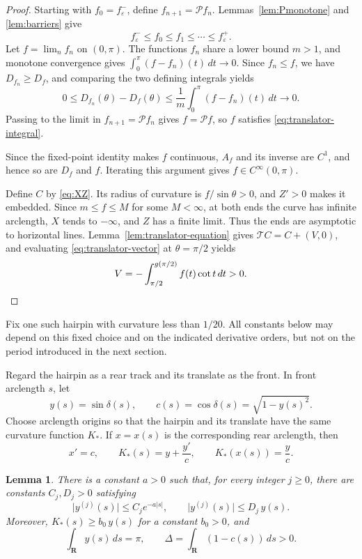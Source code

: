 \documentclass[11pt]{article}
\numberwithin{equation}{section}
\newtheorem{lemma}[theorem]{Lemma}
\newcommand{\R}{\mathbf{R}}
\newcommand{\Tmap}{\mathcal T}
\newcommand{\eps}{\varepsilon}
\newcommand{\abs}[1]{\lvert #1\rvert}
\begin{document}
\begin{proof}
Starting with \(f_0=f_\eps^-\), define \(f_{n+1}=\mathcal P f_n\).
Lemmas~\ref{lem:Pmonotone} and \ref{lem:barriers} give
\[
  f_\eps^-\leq f_0\leq f_1\leq\cdots\leq f_\eps^+.
\]
Let \(f=\lim_n f_n\) on \((0,\pi)\). The functions \(f_n\) share a lower bound
\(m>1\), and monotone convergence gives
\(\int_0^\pi(f-f_n)(t)\,dt\to0\). Since \(f_n\leq f\), we have
\(D_{f_n}\geq D_f\), and comparing the two defining integrals yields
\[
  0\leq D_{f_n}(\theta)-D_f(\theta)
  \leq\frac1m\int_0^\pi(f-f_n)(t)\,dt\longrightarrow0.
\]
Passing to the limit in \(f_{n+1}=\mathcal P f_n\) gives
\(f=\mathcal P f\), so \(f\) satisfies \eqref{eq:translator-integral}.

Since the fixed-point identity makes \(f\) continuous, \(A_f\) and its
inverse are \(C^1\), and hence so are \(D_f\) and \(f\). Iterating this
argument gives \(f\in C^\infty(0,\pi)\).

Define \(C\) by \eqref{eq:XZ}. Its radius of curvature is
\(f/\sin\theta>0\), and \(Z'>0\) makes it embedded. Since \(m\leq f\leq M\)
for some \(M<\infty\), at both ends the curve has infinite arclength,
\(X\) tends to \(-\infty\), and \(Z\) has a finite limit. Thus the ends are
asymptotic to horizontal lines. Lemma~\ref{lem:translator-equation} gives
\(\Tmap C=C+(V,0)\), and evaluating \eqref{eq:translator-vector} at
\(\theta=\pi/2\) yields
\[
  V=-\int_{\pi/2}^{g(\pi/2)}f(t)\cot t\,dt>0.
  \qedhere
\]
\end{proof}

Fix one such hairpin with curvature less than \(1/20\). All constants below may
depend on this fixed choice and on the indicated derivative orders, but not
on the period introduced in the next section.

Regard the hairpin as a rear track and its translate as the front. In front
arclength \(s\), let
\[
  y(s)=\sin\delta(s),\qquad c(s)=\cos\delta(s)=\sqrt{1-y(s)^2}.
\]
Choose arclength origins so that the hairpin and its translate have the same
curvature function \(K_*\). If \(x=x(s)\) is the corresponding
rear arclength, then
\begin{equation}\label{eq:hairpin-curvatures}
  x'=c,\qquad K_*(s)=y+\frac{y'}c,\qquad K_*(x(s))=\frac yc.
\end{equation}

\begin{lemma}\label{lem:pulse}
There is a constant \(a>0\) such that, for every integer \(j\geq0\), there are
constants \(C_j,D_j>0\) satisfying
\begin{equation}\label{eq:pulse-bounds}
  \abs{y^{(j)}(s)}\leq C_j e^{-a\abs s},\qquad
  \abs{y^{(j)}(s)}\leq D_j\,y(s).
\end{equation}
Moreover, \(K_*(s)\geq b_0\,y(s)\) for a constant \(b_0>0\), and
\[
  \int_\R y(s)\,ds=\pi,\qquad
  \Delta=\int_\R(1-c(s))\,ds>0.
\]
\end{lemma}
\end{document}
